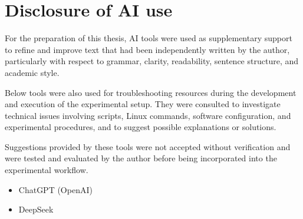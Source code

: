 
\chapter*{Disclosure of AI use}
For the preparation of this thesis, AI tools were used as supplementary support to refine and improve text that had been independently 
written by the author, particularly with respect to grammar, clarity, readability, sentence structure, and academic style. 

Below tools were also used for troubleshooting resources during the development and execution of the experimental setup. They were consulted 
to investigate technical issues involving scripts, Linux commands, software configuration, and experimental procedures, and to suggest 
possible explanations or solutions. 

Suggestions provided by these tools were not accepted without verification and were tested and evaluated by the author before 
being incorporated into the experimental workflow.

\begin{itemize}
    \item ChatGPT (OpenAI) 
    \item DeepSeek
\end{itemize}

\vspace*{5\baselineskip}